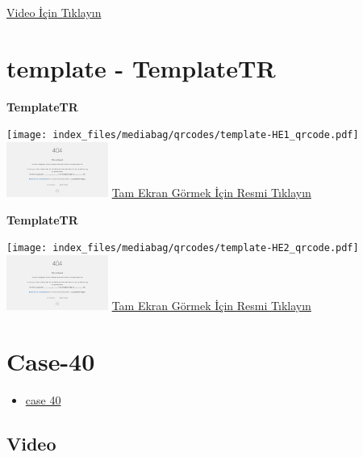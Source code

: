 \documentclass[
  letterpaper,
  DIV=11,
  numbers=noendperiod]{scrreprt}
\providecommand{\tightlist}{%
  \setlength{\itemsep}{0pt}\setlength{\parskip}{0pt}}\usepackage{longtable,booktabs,array}
\begin{document}
\href{https://www.youtube.com/watch?v=q4nuIBROlZI}{Video İçin Tıklayın}

\hypertarget{sec-template}{%
\section{template - TemplateTR}\label{sec-template}}

\textbf{TemplateTR}

\texttt{[image: index\_files/mediabag/qrcodes/template-HE1\_qrcode.pdf]}
\href{https://images.patolojiatlasi.com/template/HE1.html}{\includegraphics[width=0.25\textwidth,height=\textheight]{./screenshots/thumbnail_template-HE1.png}}
\href{https://images.patolojiatlasi.com/template/HE1.html}{Tam Ekran
Görmek İçin Resmi Tıklayın}

\textbf{TemplateTR}

\texttt{[image: index\_files/mediabag/qrcodes/template-HE2\_qrcode.pdf]}
\href{https://images.patolojiatlasi.com/template/HE2.html}{\includegraphics[width=0.25\textwidth,height=\textheight]{./screenshots/thumbnail_template-HE2.png}}
\href{https://images.patolojiatlasi.com/template/HE2.html}{Tam Ekran
Görmek İçin Resmi Tıklayın}

\hypertarget{sec-hacettepe-case-of-the-month-case-}{%
\section{Case-40}\label{sec-hacettepe-case-of-the-month-case-}}

\begin{itemize}
\tightlist
\item
  \href{https://www.youtube.com/watch?v=In97sPfT9w4&ab_channel=KemalKosemehmetoglu}{case
  40}
\end{itemize}

\hypertarget{video-39}{%
\subsection{Video}\label{video-39}}
\end{document}
